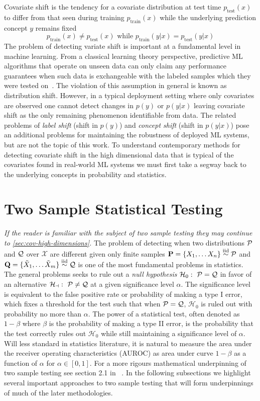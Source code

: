 Covariate shift is the tendency for a covariate distribution at test time $p_{\text{test}}(x)$ to differ from that seen
during training $p_{\text{train}}(x)$ while the underlying prediction concept $y$ remains fixed~\citep{covbook}
\[p_{\text{train}}(x)\neq p_{\text{test}}(x) \text{ while } p_{\text{train}}(y|x)=p_{\text{test}}(y|x)\]
The problem of detecting variate shift is important at a fundamental level in machine learning.
From a classical learning theory perspective, predictive ML algorithms that operate on unseen data
can only claim any performance guarantees when such data is exchangeable with the labeled samples which they were tested on~\citep{Haussler90probablyapproximately}.
The violation of this assumption in general is known as distribution shift.
However, in a typical deployment setting where only covariates are observed one cannot detect changes in $p(y)$ or $p(y|x)$ leaving covariate shift as the only remaining phenomenon identifiable from data.
The related problems of \textit{label shift} ({shift in $p(y)$}) and \textit{concept shift} (shift in $p(y|x)$) pose an additional problems for maintaining the robustness of deployed ML systems, but are not the topic of this work.
To understand contemporary methods for detecting covariate shift in the high dimensional data that is typical of the covariates found in real-world ML systems we must first take a segway back to the underlying concepts in probability and statistics.


\section{Two Sample Statistical Testing}
\textit{If the reader is familiar with the subject of two sample testing they may continue to \autoref{sec:cov-high-dimensions}.}
\smallbreak\noindent
The problem of detecting when two distributions $\mathcal{P}$ and $\mathcal{Q}$ over $\mathcal{X}$ are different given only finite samples $\mathbf{P}=\{X_1,\ldots X_n\}\overset{\text{iid}}{\sim} {\mathcal{P}}$ and $\mathbf{Q}=\{\tilde{X}_1,\ldots \tilde{X}_m\}\overset{\text{iid}}{\sim} {\mathcal{Q}}$ is one of the most fundamental problems in statistics.
The general problems seeks to rule out a \textit{null hypothesis} $\mathcal{H}_0:\ \mathcal{P}=\mathcal{Q}$ in favor of an alternative $\mathcal{H_a}:\ \mathcal{P}\neq \mathcal{Q}$ at a given significance level $\alpha$.
The significance level is equivalent to the false positive rate or probability of making a type I error, which fixes a threshold for the test such that when $\mathcal{P}=\mathcal{Q}$, $\mathcal{H}_0$ is ruled out with probability no more than $\alpha$.
The power of a statistical test, often denoted as $1-\beta$ where $\beta$ is the probability of making a type II error, is the probability that the test correctly rules out $\mathcal{H}_0$ while still maintaining a significance level of $\alpha$.
Will less standard in statistics literature, it is natural to measure the area under the receiver operating characteristics (AUROC) as area under curve $1-\beta$ as a function of $\alpha$ for $\alpha\in [0,1]$.
For a more rigours mathematical underpinning of two sample testing see section 2.1 in ~\citeauthor{twosampletestingbackground}.
In the following subsections we highlight several important approaches to two sample testing that will form underpinnings of much of the later methodologies.

